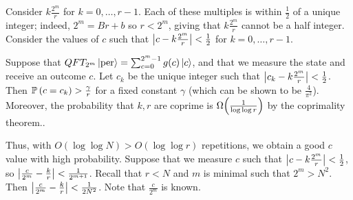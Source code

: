 Consider \( k\frac{2^m}{r} \) for \( k = 0, \dots, r-1 \).
Each of these multiples is within \( \frac{1}{2} \) of a unique integer; indeed, \( 2^m = Br + b \) so \( r < 2^m \), giving that \( k\frac{2^m}{r} \) cannot be a half integer.
Consider the values of \( c \) such that \( \abs{c - k \frac{2^m}{r}} < \frac{1}{2} \) for \( k = 0, \dots, r-1 \).
\begin{theorem}
    Suppose that \( QFT_{2^m} \ket{\mathrm{per}} = \sum_{c=0}^{2^m - 1} g(c) \ket{c} \), and that we measure the state and receive an outcome \( c \).
    Let \( c_k \) be the unique integer such that \( \abs{c_k - k\frac{2^m}{r}} < \frac{1}{2} \).
    Then \( \mathbb{P}\left({c = c_k}\right) > \frac{\gamma}{r} \) for a fixed constant \( \gamma \) (which can be shown to be \( \frac{4}{\pi^2} \)).
    Moreover, the probability that \( k, r \) are coprime is \( \Omega\qty(\frac{1}{\log \log r}) \) by the coprimality theorem..
\end{theorem}
Thus, with \( O(\log \log N) > O(\log \log r) \) repetitions, we obtain a good \( c \) value with high probability.
Suppose that we measure \( c \) such that \( \abs{c - k \frac{2^m}{r}} < \frac{1}{2} \), so \( \abs{\frac{c}{2^m} - \frac{k}{r}} < \frac{1}{2^{m+1}} \).
Recall that \( r < N \) and \( m \) is minimal such that \( 2^m > N^2 \).
Then \( \abs{\frac{c}{2^m} - \frac{k}{r}} < \frac{1}{2N^2} \).
Note that \( \frac{c}{2^m} \) is known.


